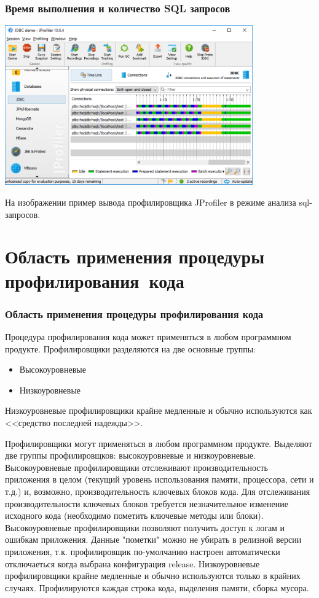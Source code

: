 \documentclass{../industrial-development}
\begin{document}
\begin{frame} \frametitle{Время выполнения и количество SQL запросов}
	\centerline{\includegraphics[width=0.8\textwidth]{database.pdf}}
\end{frame}
\lecturenotes
На изображении пример вывода профилировщика JProfiler в режиме анализа sql-запросов.

\section{Область применения процедуры профилирования~кода}

\begin{frame} \frametitle{Область применения процедуры профилирования кода}
	\begin{block}{}
		Процедура профилирования кода может применяться в любом программном продукте. Профилировщики разделяются на две основные группы:
	\end{block}
	
	\begin{itemize}
		\item Высокоуровневые
		\item Низкоуровневые
	\end{itemize}

	\begin{block}{}
		Низкоуровневые профилировщики \alert{крайне медленные} и обычно используются как <<средство последней надежды>>.
	\end{block}
\end{frame}

\lecturenotes
Профилировщики могут применяться в любом программном продукте. Выделяют две группы профилировщков: высокоуровневые и низкоуровневые. Высокоуровневые профилировщики отслеживают производительность приложения в целом (текущий уровень использования памяти, процессора, сети и т.д.) и, возможно, производительность ключевых блоков кода. Для отслеживания производительности ключевых блоков требуется незначительное изменение исходного кода (необходимо пометить ключевые методы или блоки). Высокоуровневые профилировщики позволяют получить доступ к логам и ошибкам приложения. Данные "пометки" можно не убирать в релизной версии приложения, т.к. профилировщик по-умолчанию настроен автоматически отключаеться когда выбрана конфигурация release.
Низкоуровневые профилировщики крайне медленные и обычно используются только в крайних случаях. Профилируются каждая строка кода, выделения памяти, сборка мусора.
\end{document}
